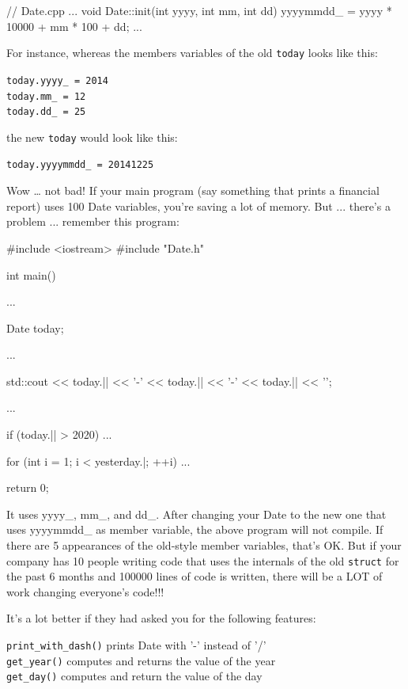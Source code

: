 \begin{consolethree}[escapeinside=||]
// Date.cpp
...
void Date::init(int yyyy, int mm, int dd)
{
    yyyymmdd_ = yyyy * 10000 + mm * 100 + dd;
}
...
\end{consolethree}

For instance, whereas the members variables of the old \texttt{today}
looks like this:
\begin{center}
\texttt{today.yyyy\_ = 2014}\\

\texttt{today.mm\_ = 12}\\

\texttt{today.dd\_ = 25}\\
\end{center}
the new \texttt{today} would look like this:

\texttt{today.yyyymmdd\_ = 20141225}

Wow … not bad! If your main program (say something that prints a
financial report) uses 100 Date variables, you're saving a lot of memory.
But ... there's a problem ... remember this program:

\begin{consolethree}[escapeinside=||]
#include <iostream>
#include "Date.h"

int main()
{
    ...

    Date today;

    ...

    std::cout << today.|| << '-'
              << today.|| << '-'
              << today.|| << '\n';

    ...
    
    if (today.|| > 2020)
    {
        ...
    }

    for (int i = 1; i < yesterday.|; ++i)
    {
        ...
    }

    return 0;
}
\end{consolethree}
It uses yyyy\_, mm\_, and dd\_. After changing your Date to the new one that uses yyyymmdd\_ as member variable, the above program will not compile. If there are 5 appearances of the old-style member variables, that's OK. But if your company has 10 people writing code that uses the internals of the old \texttt{struct} for the past 6 months and 100000 lines of code is written, there will be a LOT of work changing everyone's code!!!

It's a lot better if they had asked you for the
following features:
\begin{center}
\texttt{print\_with\_dash()} prints Date with '-' instead of '/'\\

\texttt{get\_year()} computes and returns the value of the year\\

\texttt{get\_day()} computes and return the value of the day\\
\end{center}

